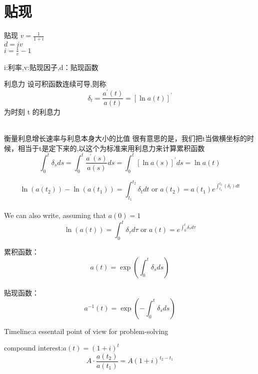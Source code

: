 	\section{贴现}
	\begin{definition}{贴现}
\noindent	$v=\frac{1}{1+i}$ \\ $d=iv$\\ $i=\frac{1}{v}-1$
	\end{definition}
\begin{note}
i:利率,v:贴现因子,d：贴现函数
\end{note}
\begin{definition}{利息力}
\noindent		设可积函数连续可导,则称
\[
\delta_{t}=\frac{a^{\prime}(t)}{a(t)}=[\ln a(t)]^{\prime}
\]
为时刻 t 的利息力
		\end{definition}
		\\ 衡量利息增长速率与利息本身大小的比值
		很有意思的是，我们把t当做横坐标的时候，相当于t是定下来的,以这个为标准来用利息力来计算累积函数
		$$\int_{0}^{t} \delta_{s} d s=\int_{0}^{t} \frac{a^{\prime}(s)}{a(s)} d s=\int_{0}^{t}[\ln a(s)]^{\prime} d s=\ln a(t)$$
		\begin{property}
		$$\ln \left(a\left(t_{2}\right)\right)-\ln \left(a\left(t_{1}\right)\right)=\int_{t_{1}}^{t_{2}} \delta_{t} d t \text { or } a\left(t_{2}\right)=a\left(t_{1}\right) e^{\int_{t_{1}}^{t_{2}}\left(\delta_{t}\right) d t}$$
\\We can also write, assuming that $a(0)=1$
\[
\ln (a(t))=\int_{0}^{t} \delta_{\tau} d \tau \text { or } a(t)=e^{\int_{0}^{t} \delta_{\tau} d \tau}
\]
\end{property}
\begin{property}
	累积函数：\\
\[
a(t)=\exp \left(\int_{0}^{t} \delta_{s} d s\right)
\]\\
 贴现函数：\\
\[
a^{-1}(t)=\exp \left(-\int_{0}^{t} \delta_{s} d s\right)
\]
	\end{property}
Timeline:a essentail point of view for problem-solving \\
\begin{example}
compound interest:$a(t)=(1+i)^t$\\
$$A \cdot \frac{a\left(t_{2}\right)}{a\left(t_{1}\right)}=A(1+i)^{t_{2}-t_{1}}$$
\end{example}

